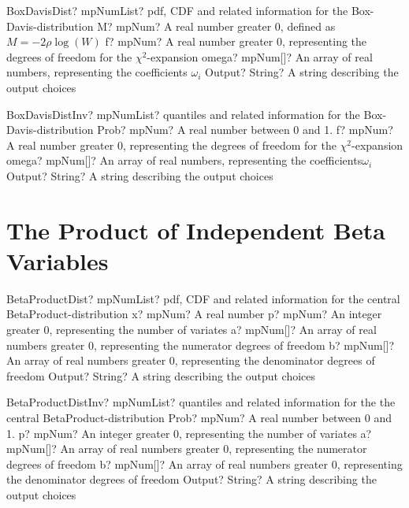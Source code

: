 \documentclass[12pt,a4paper,openany]{book}
\begin{document}
\begin{mpFunctionsExtract}
\mpFunctionFourNotImplemented
{BoxDavisDist? mpNumList? pdf, CDF and related information for the Box-Davis-distribution}
{M? mpNum? A real number greater 0, defined as $M=-2 \rho \log(W)$}
{f? mpNum? A real number greater 0, representing the degrees of freedom for the $\chi^2$-expansion}
{omega? mpNum[]? An array of real numbers, representing the coefficients $\omega_i$}
{Output? String? A string describing the output choices}
\end{mpFunctionsExtract}

\begin{mpFunctionsExtract}
\mpFunctionFourNotImplemented
{BoxDavisDistInv? mpNumList? quantiles and related information for the Box-Davis-distribution}
{Prob? mpNum? A real number between 0 and 1.}
{f? mpNum? A real number greater 0, representing the degrees of freedom for the $\chi^2$-expansion}
{omega? mpNum[]? An array of real numbers, representing the coefficients$\omega_i$}
{Output? String? A string describing the output choices}
\end{mpFunctionsExtract}

\section{The Product of Independent Beta Variables}

\begin{mpFunctionsExtract}
\mpFunctionFiveNotImplemented
{BetaProductDist? mpNumList? pdf, CDF and related information for the central BetaProduct-distribution}
{x? mpNum? A real number}
{p? mpNum? An integer greater 0, representing the number of variates}
{a? mpNum[]? An array of real numbers greater 0, representing the numerator  degrees of freedom}
{b? mpNum[]? An array of real numbers greater 0, representing the denominator degrees of freedom}
{Output? String? A string describing the output choices}
\end{mpFunctionsExtract}

\begin{mpFunctionsExtract}
\mpFunctionFiveNotImplemented
{BetaProductDistInv? mpNumList? quantiles and related information for the the central BetaProduct-distribution}
{Prob? mpNum? A real number between 0 and 1.}
{p? mpNum? An integer greater 0, representing the number of variates}
{a? mpNum[]? An array of real numbers greater 0, representing the numerator  degrees of freedom}
{b? mpNum[]? An array of real numbers greater 0, representing the denominator degrees of freedom}
{Output? String? A string describing the output choices}
\end{mpFunctionsExtract}
\end{document}
